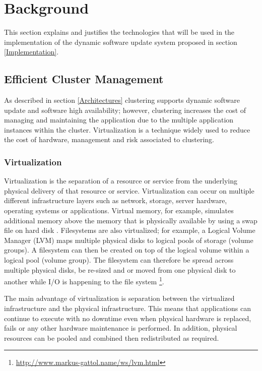 \documentclass[a4paper,11pt,twoside]{article}
\begin{document}
\clearpage
\section{Background}
This section explains and justifies the technologies that will be used in the implementation of the dynamic software update system proposed in section \ref{Implementation}.
 
\subsection{Efficient Cluster Management} 

As described in section \ref{Architectures} clustering supports dynamic software update and software high availability; however, clustering increases the cost of managing and maintaining the application due to the multiple application instances within the cluster. Virtualization is a technique widely used to reduce the cost of hardware, management and risk associated to clustering.

\subsubsection{Virtualization} 

Virtualization is the separation of a resource or service from the underlying physical delivery of that resource or service. Virtualization can occur on multiple different infrastructure layers such as network, storage, server hardware, operating systems or applications. Virtual memory, for example, simulates additional memory above the memory that is physically available by using a swap file on hard disk \cite{virtualization}. Filesystems are also virtualized; for example, a Logical Volume Manager (LVM) maps multiple physical disks to logical pools of storage (volume groups). A filesystem can then be created on top of the logical volume within a logical pool (volume group). The filesystem can therefore be spread across multiple physical disks, be re-sized and or moved from one physical disk to another while I/O is happening to the file system \footnote{ \url {http://www.markus-gattol.name/ws/lvm.html}}. 

The main advantage of virtualization is separation between the virtualized infrastructure and the physical infrastructure. This means that applications can continue to execute with no downtime even when physical hardware is replaced, fails or any other hardware maintenance is performed. In addition, physical resources can be pooled and combined then redistributed as required.
\end{document}
